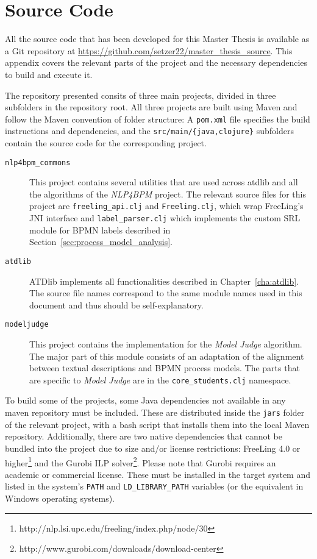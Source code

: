 \chapter{Source Code}

All the source code that has been developed for this Master Thesis is available
as a Git repository at \url{https://github.com/setzer22/master_thesis_source}.
This appendix covers the relevant parts of the project and the necessary
dependencies to build and execute it.

The repository presented consits of three main projects, divided in three
subfolders in the repository root. All three projects are built using Maven and
follow the Maven convention of folder structure: A \texttt{pom.xml} file
specifies the build instructions and dependencies, and the
\texttt{src/main/\{java,clojure\}} subfolders contain the source code for the
corresponding project.

\begin{description}
\item[\texttt{nlp4bpm\_commons}]{This project contains several utilities that
    are used across atdlib and all the algorithms of the \emph{NLP4BPM} project.
    The relevant source files for this project are \texttt{freeling\_api.clj} and
    \texttt{Freeling.clj}, which wrap FreeLing's JNI interface and
    \texttt{label\_parser.clj} which implements the custom SRL module for BPMN
    labels described in Section~\ref{sec:process_model_analysis}.}
\item[\texttt{atdlib}]{ATDlib implements all functionalities described in
    Chapter~\ref{cha:atdlib}. The source file names correspond to the same
    module names used in this document and thus should be self-explanatory.}
\item[\texttt{modeljudge}]{This project contains the implementation for the
    \emph{Model Judge} algorithm. The major part of this module consists of an
    adaptation of the alignment between textual descriptions and BPMN process
    models. The parts that are specific to \emph{Model Judge} are in the
    \texttt{core\_students.clj} namespace.}
\end{description}

To build some of the projects, some Java dependencies not available in any maven
repository must be included. These are distributed inside the \texttt{jars}
folder of the relevant project, with a bash script that installs them into the
local Maven repository. Additionally, there are two native dependencies that
cannot be bundled into the project due to size and/or license restrictions:
FreeLing 4.0 or
higher\footnote{http://nlp.lsi.upc.edu/freeling/index.php/node/30} and the
Gurobi ILP solver\footnote{http://www.gurobi.com/downloads/download-center}.
Please note that Gurobi requires an academic or commercial license. These must
be installed in the target system and listed in the system's \texttt{PATH} and
\texttt{LD\_LIBRARY\_PATH} variables (or the equivalent in Windows operating
systems).





